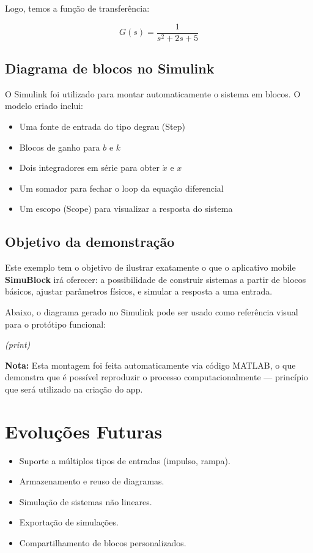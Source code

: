 \documentclass[12pt]{article}
\begin{document}
Logo, temos a função de transferência:

\[
G(s) = \frac{1}{s^2 + 2s + 5}
\]

\subsection*{Diagrama de blocos no Simulink}

O Simulink foi utilizado para montar automaticamente o sistema em blocos. O modelo criado inclui:
\begin{itemize}
    \item Uma fonte de entrada do tipo degrau (Step)
    \item Blocos de ganho para \( b \) e \( k \)
    \item Dois integradores em série para obter \( \dot{x} \) e \( x \)
    \item Um somador para fechar o loop da equação diferencial
    \item Um escopo (Scope) para visualizar a resposta do sistema
\end{itemize}

\subsection*{Objetivo da demonstração}

Este exemplo tem o objetivo de ilustrar exatamente o que o aplicativo mobile \textbf{SimuBlock} irá oferecer: a possibilidade de construir sistemas a partir de blocos básicos, ajustar parâmetros físicos, e simular a resposta a uma entrada.

Abaixo, o diagrama gerado no Simulink pode ser usado como referência visual para o protótipo funcional:

\vspace{0.5cm}
\textit{(print)}
\vspace{0.5cm}

\textbf{Nota:} Esta montagem foi feita automaticamente via código MATLAB, o que demonstra que é possível reproduzir o processo computacionalmente — princípio que será utilizado na criação do app.

\section*{Evoluções Futuras}

\begin{itemize}
    \item Suporte a múltiplos tipos de entradas (impulso, rampa).
    \item Armazenamento e reuso de diagramas.
    \item Simulação de sistemas não lineares.
    \item Exportação de simulações.
    \item Compartilhamento de blocos personalizados.
\end{itemize}
\end{document}
